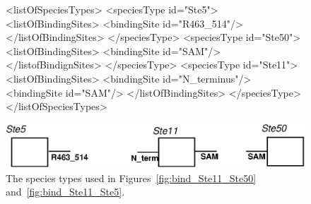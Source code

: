 \documentclass{cekarticle}
\begin{document}
\begin{figure}[h]
\begin{example}
<listOfSpeciesTypes>
    <speciesType id="Ste5">
        <listOfBindingSites>
            <bindingSite id="R463_514"/>
        </listOfBindingSites>
    </speciesType>
    <speciesType id="Ste50">
        <listOfBindingSites>
            <bindingSite id="SAM"/>
        </listofBindignSites>
    </speciesType>
    <speciesType id="Ste11">
        <listOfBindingSites>
            <bindingSite id="N_terminus"/>
            <bindingSite id="SAM"/>
        </listOfBindingSites>
    </speciesType>
</listOfSpeciesTypes>
\end{example}
  \vspace*{8pt}
  \centering
  \includegraphics[scale = 0.7]{non_exclusive_binding_types.eps}
  \caption{The species types used in Figures~\ref{fig:bind_Ste11_Ste50} and~\ref{fig:bind_Ste11_Ste5}.}
  \label{fig:non_exclusive_binding_types}
\end{figure}
\end{document}
